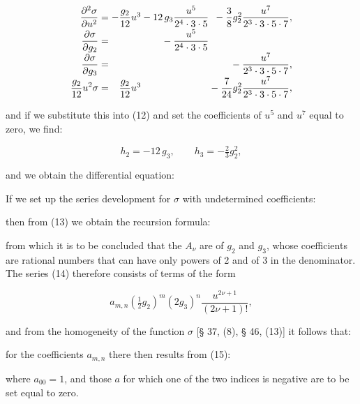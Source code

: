 \[
\begin{array}{r@{}c@{}r@{}r@{}r}
\displaystyle\frac{\partial^2\sigma}{\partial u^2} &{}={}& -\dfrac{g_2}{12}u^3 &{}- 12\,g_3\dfrac{u^5}{2^4\cdot3\cdot5} &{}- \dfrac{3}{8}g_2^2\dfrac{u^7}{2^3\cdot3\cdot5\cdot7},\\[2mm]
\displaystyle\frac{\partial\sigma}{\partial g_2} &{}={}& &{}- \dfrac{u^5}{2^4\cdot3\cdot5} &\\[2mm]
\displaystyle\frac{\partial\sigma}{\partial g_3} &{}={}& & &{}- \dfrac{u^7}{2^3\cdot3\cdot5\cdot7},\\[2mm]
\displaystyle\frac{g_2}{12}u^2\sigma &{}={}& \dfrac{g_2}{12}u^3 & &{}-\dfrac{7}{24}g_2^2\dfrac{u^7}{2^3\cdot3\cdot5\cdot7},
\end{array}
\]

and if we substitute this into (12) and set the coefficients of $u^5$
and $u^7$ equal to zero, we find:

\[
h_2 = -12\,g_3, \qquad h_3 = -\tfrac{2}{3}g_2^2,
\]

and we obtain the differential equation:


If we set up the series development for $\sigma$ with undetermined
coefficients:


then from (13) we obtain the recursion formula:


from which it is to be concluded that the $A_\nu$ are  of $g_2$ and $g_3$, whose coefficients are rational numbers
that can have only powers of 2 and of 3 in the denominator. The series
(14) therefore consists of terms of the form

\[
a_{m,n}\left(\tfrac12 g_2\right)^m(2g_3)^n\dfrac{u^{2\nu+1}}{(2\nu+1)!},
\]

and from the homogeneity of the function $\sigma$ [§ 37, (8), § 46,
(13)] it follows that:


for the coefficients $a_{m,n}$ there then results from (15):


where $a_{00}=1$, and those $a$ for which one of the two indices is
negative are to be set equal to zero.

